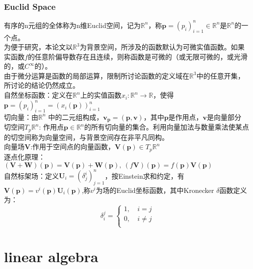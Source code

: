 \documentclass[UTF8]{../../09-Mathematics}
\begin{document}
\subsection{Euclid Space}
有序的n元组的全体称为n维Euclid空间，记为$\mathbb R^n$，称$\boldsymbol p=(p_i)_{i=1}^n \in \mathbb R^n$是$\mathbb R^n$的一个点。\\
为便于研究，本论文以$ \mathbb R^3$为背景空间，所涉及的函数默认为可微实值函数。如果实函数$f$的任意阶偏导数存在且连续，则称函数是可微的（或无限可微的，或光滑的，或$C^\infty$的）。\\
由于微分运算是函数的局部运算，限制所讨论函数的定义域在$ \mathbb R^3$中的任意开集，所讨论的结论仍然成立。\\
自然坐标函数：定义在$\mathbb R^n$上的实值函数$x_i: \mathbb R^n \to  \mathbb R$，使得$\boldsymbol p=(p_i)_{i=1}^n = \left( x_i(\boldsymbol p) \right)_{i=1}^n   $\\
切向量：由$\mathbb R^n$ 中的二元组构成，$\boldsymbol v_{\boldsymbol p}=(\boldsymbol p,\boldsymbol v)$，其中$\boldsymbol p$是作用点，$\boldsymbol v$是向量部分\\
切空间$T_p  \mathbb R^n$: 作用点$\boldsymbol p \in \mathbb R^n$的所有切向量的集合。利用向量加法与数量乘法使某点的切空间称为向量空间，与背景空间存在非平凡同构。\\
向量场$\boldsymbol V$:作用于空间点的向量函数，$\boldsymbol V(\boldsymbol p)\in T_p  \mathbb R^n $\\
逐点化原理：$(\boldsymbol V+\boldsymbol W)(\boldsymbol p)=\boldsymbol V(\boldsymbol p)+\boldsymbol W(\boldsymbol p),\ (f \boldsymbol V)(\boldsymbol p)= f(\boldsymbol p)\boldsymbol V (\boldsymbol p)$\\
自然标架场：定义$\boldsymbol U_i=(\delta _j^i)_{j=1}^n$，按Einstein求和约定，有$\boldsymbol V(\boldsymbol p)=v^i(\boldsymbol p)\boldsymbol U_i(\boldsymbol p)$,称$v^i$为场的Euclid坐标函数，其中Kronecker $\delta$函数定义为：
\begin{equation}
\label{Kronecker_delta}
\delta _i^j=\left\{ 
    \begin{aligned}
    1,\  & i =j\\
    0,\  & i \neq j\\
    \end{aligned}
     \right.
\end{equation}






\chapter{linear algebra}
\end{document}
